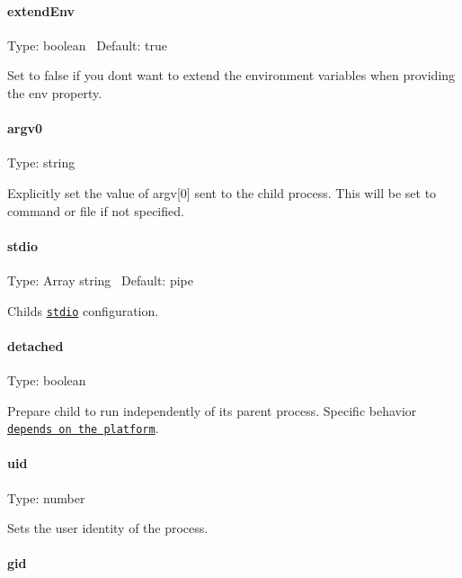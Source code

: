 \paragraph*{extend\+Env}

Type\+: {\ttfamily boolean}~\newline
 Default\+: {\ttfamily true}

Set to {\ttfamily false} if you don\textquotesingle{}t want to extend the environment variables when providing the {\ttfamily env} property.

\paragraph*{argv0}

Type\+: {\ttfamily string}

Explicitly set the value of {\ttfamily argv\mbox{[}0\mbox{]}} sent to the child process. This will be set to {\ttfamily command} or {\ttfamily file} if not specified.

\paragraph*{stdio}

Type\+: {\ttfamily Array} {\ttfamily string}~\newline
 Default\+: {\ttfamily pipe}

Child\textquotesingle{}s \href{https://nodejs.org/api/child_process.html#child_process_options_stdio}{\tt stdio} configuration.

\paragraph*{detached}

Type\+: {\ttfamily boolean}

Prepare child to run independently of its parent process. Specific behavior \href{https://nodejs.org/api/child_process.html#child_process_options_detached}{\tt depends on the platform}.

\paragraph*{uid}

Type\+: {\ttfamily number}

Sets the user identity of the process.

\paragraph*{gid}

